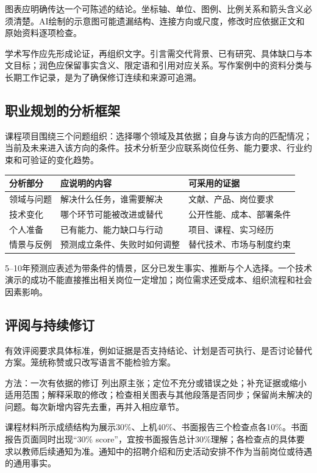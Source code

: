 \documentclass[UTF8,fontset=none,zihao=-4,a4paper]{ctexart}
\begin{document}
图表应明确传达一个可陈述的结论。坐标轴、单位、图例、比例关系和箭头含义必须清楚。AI绘制的示意图可能遗漏结构、连接方向或尺度，修改时应依据正文和原始资料逐项检查。

学术写作应先形成论证，再组织文字。引言需交代背景、已有研究、具体缺口与本文目标；润色应保留事实含义、限定语和引用对应关系。写作案例中的资料分类与长期工作记录，是为了确保修订连续和来源可追溯。

\subsection{职业规划的分析框架}
课程项目围绕三个问题组织：选择哪个领域及其依据；自身与该方向的匹配情况；当前及未来进入该方向的条件。技术分析至少应联系岗位任务、能力要求、行业约束和可验证的变化趋势。

\begin{center}\begin{tabularx}{\linewidth}{lYY}
\toprule 分析部分 & 应说明的内容 & 可采用的证据\\\midrule
领域与问题 & 解决什么任务，谁需要解决 & 文献、产品、岗位要求\\
技术变化 & 哪个环节可能被改进或替代 & 公开性能、成本、部署条件\\
个人准备 & 已有能力、能力缺口与行动 & 项目、课程、实习经历\\
情景与反例 & 预测成立条件、失败时如何调整 & 替代技术、市场与制度约束\\\bottomrule
\end{tabularx}\end{center}
5--10年预测应表述为带条件的情景，区分已发生事实、推断与个人选择。一个技术演示的成功不能直接推出相关岗位一定增加；岗位需求还受成本、组织流程和社会因素影响。

\subsection{评阅与持续修订}
有效评阅要求具体标准，例如证据是否支持结论、计划是否可执行、是否讨论替代方案。笼统称赞或只改写语言不能检验方案。

\begin{infobox}{方法：一次有依据的修订}
列出原主张；定位不充分或错误之处；补充证据或缩小适用范围；解释采取的修改；检查相关图表与其他段落是否同步；保留尚未解决的问题。每次新增内容先去重，再并入相应章节。
\end{infobox}
课程材料所示成绩结构为展示30\%、上机40\%、书面报告三个检查点各10\%。书面报告页面同时出现“30\% score”，宜按书面报告总计30\%理解；各检查点的具体要求以教师后续通知为准。通知中的招聘介绍和历史活动安排不作为当前岗位或待遇的通用事实。
\end{document}
